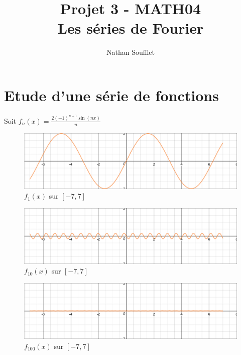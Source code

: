 \documentclass{article}
\begin{document}
\title{Projet 3 - MATH04 \\ Les séries de Fourier}
\author{Nathan Soufflet}

\maketitle
{}
\newpage

\section{Etude d'une série de fonctions}

Soit $f_n(x) = \frac{2 (-1)^{n + 1}\sin(nx)}{n}$

\begin{figure}[ht!]
    \centering
    \includegraphics[width=\textwidth]{figures/f_n_1.png}
    \caption{$f_{1}(x)$ sur $[-7, 7]$}
\end{figure}

\begin{figure}[ht!]
    \centering
    \includegraphics[width=\textwidth]{figures/f_n_10.png}
    \caption{$f_{10}(x)$ sur $[-7, 7]$}
\end{figure}

\begin{figure}[ht!]
    \centering
    \includegraphics[width=\textwidth]{figures/f_n_100.png}
    \caption{$f_{100}(x)$ sur $[-7, 7]$}
\end{figure}
\end{document}
